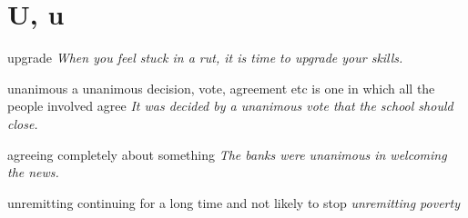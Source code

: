 \section{U, u}

\begin{DefWord}{upgrade}
    \textit{When you feel stuck in a rut, it is time to upgrade your skills.}
\end{DefWord}

\begin{DefWord}{unanimous}
    a unanimous decision, vote, agreement etc is one in which all the people involved agree
    \textit{It was decided by a unanimous vote that the school should close.}

    agreeing completely about something
    \textit{The banks were unanimous in welcoming the news.}
\end{DefWord}

\begin{DefWord}{unremitting}
    continuing for a long time and not likely to stop
    \textit{unremitting poverty}
\end{DefWord}